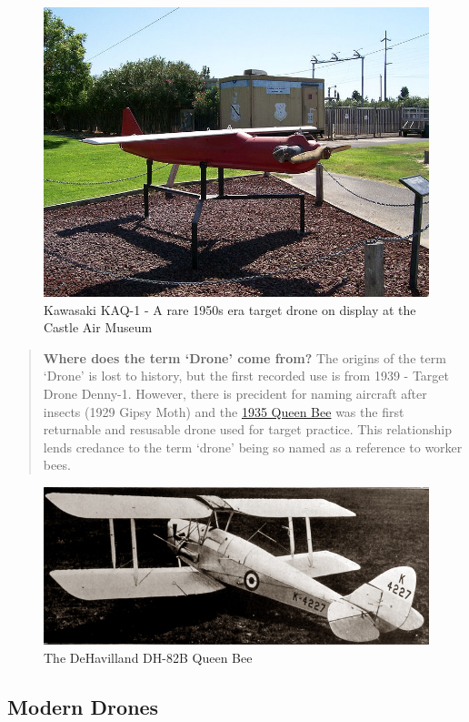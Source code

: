 \documentclass[
]{book}
\theoremstyle{definition}
\theoremstyle{definition}
\theoremstyle{definition}
\theoremstyle{definition}
\theoremstyle{remark}
\begin{document}
\begin{figure}

{\centering \includegraphics[width=0.5\linewidth]{images/history/KAQ-1_Drone} 

}

\caption{Kawasaki KAQ-1 - A rare 1950s era target drone on display at the Castle Air Museum}\label{fig:KAQ}
\end{figure}

\begin{quote}
\textbf{Where does the term `Drone' come from?} The origins of the term `Drone' is lost to history, but the first recorded use is from 1939 - Target Drone Denny-1. However, there is precident for naming aircraft after insects (1929 Gipsy Moth) and the \href{https://www.dehavillandmuseum.co.uk/aircraft/de-havilland-dh82b-queen-bee/}{1935 Queen Bee} was the first returnable and resusable drone used for target practice. This relationship lends credance to the term `drone' being so named as a reference to worker bees.
\end{quote}

\begin{figure}

{\centering \includegraphics[width=0.5\linewidth]{images/history/QueenBee} 

}

\caption{The DeHavilland DH-82B Queen Bee  }\label{fig:QueenBee}
\end{figure}

\hypertarget{modern-drones}{%
\subsection{Modern Drones}\label{modern-drones}}
\end{document}
